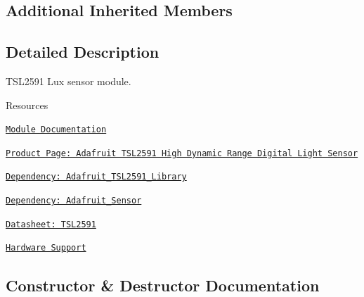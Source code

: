 \subsection*{Additional Inherited Members}


\subsection{Detailed Description}
T\+S\+L2591 Lux sensor module. 

\begin{DoxyParagraph}{Resources}

\begin{DoxyItemize}
\item \href{https://openslab-osu.github.io/Loom/html/class_loom___t_s_l2591.html}{\tt Module Documentation}
\item \href{https://www.adafruit.com/product/1980}{\tt Product Page\+: Adafruit T\+S\+L2591 High Dynamic Range Digital Light Sensor}
\item \href{https://github.com/adafruit/Adafruit_TSL2591_Library}{\tt Dependency\+: Adafruit\+\_\+\+T\+S\+L2591\+\_\+\+Library}
\item \href{https://github.com/adafruit/Adafruit_Sensor}{\tt Dependency\+: Adafruit\+\_\+\+Sensor}
\item \href{https://cdn-shop.adafruit.com/datasheets/TSL25911_Datasheet_EN_v1.pdf}{\tt Datasheet\+: T\+S\+L2591}
\item \href{https://github.com/OPEnSLab-OSU/Loom/wiki/Hardware-Support#tsl2591-light-sensor}{\tt Hardware Support} 
\end{DoxyItemize}
\end{DoxyParagraph}


\subsection{Constructor \& Destructor Documentation}
